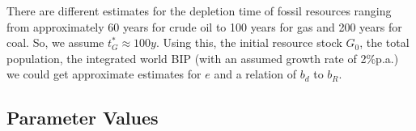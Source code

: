 There are different estimates for the depletion time of fossil resources ranging from approximately 60 years for crude oil to 100 years for gas and 200 years for coal.
So, we assume $t^*_G \approx 100y$. Using this, the initial resource stock $G_0$, the total population, the integrated world BIP (with an assumed growth rate of 2\%p.a.) we could get approximate estimates for $e$ and a relation of $b_d$ to  $b_R$.

\newpage 
\subsection{Parameter Values}


